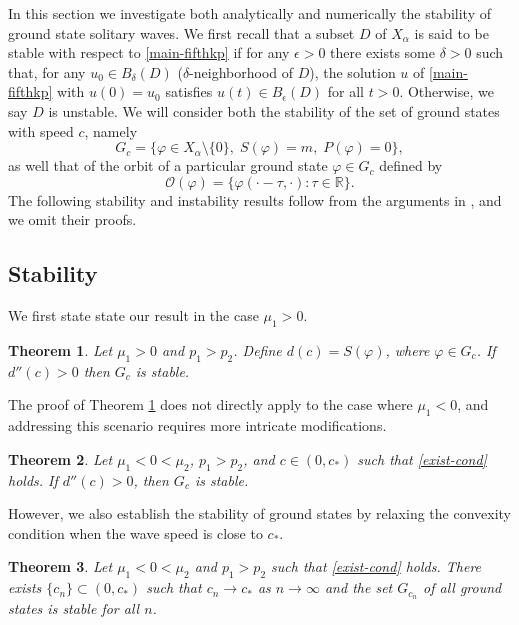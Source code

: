 \documentclass[10pt]{article}
\numberwithin{equation}{section}
\newtheorem{theorem}{\quad Theorem}[section]
\newcommand{\ff}{\varphi}
\newcommand{\mo}{\mu_1}  \newcommand{\po}{{p_1}}
\newcommand{\moo}{\mu_2}  \newcommand{\poo}{{p_2}}
\newcommand{\al}{\alpha}
\begin{document}
	In this section we investigate both analytically and numerically the stability of ground state solitary waves. We first recall that a subset $D$ of $X_\al$ is said to be stable with respect to \eqref{main-fifthkp} if for any
	$\epsilon>0$ there exists some $\delta > 0$ such that, for any $u_0\in B_\delta (D)$ ($\delta$-neighborhood of $D$), the solution $u$ of \eqref{main-fifthkp} with $u(0) = u_0$ satisfies
	$u(t)\in B_\epsilon(D) $ for all $t > 0$. Otherwise, we say $D$ is unstable. We will consider both the stability of the set of ground states with speed $c$, namely
	\[
	G_c=\{\ff\in X_\al\setminus\{0\},\;S(\ff)=m,\;P(\ff)=0\},
	\]
	as well that of the orbit of a particular ground state $\ff\in G_c$ defined by
	\[
	\mathcal{O}(\ff)=\{\ff(\cdot-\tau,\cdot):\tau\in\mathbb R\}.
	\]
	The following stability and instability results follow from the arguments in \cite{esfahani-levan-dpde}, and we omit their proofs.
	\subsection{Stability}
	 We first state state our result in the case $\mo>0$.
	\begin{theorem}\label{stability}
	Let $\mo>0$ and $\po>\poo$.
		 Define $d(c)=S(\ff)$, where $\ff\in G_c$. If $d''(c)>0$ then $G_c$ is stable.
	\end{theorem}
 The proof of Theorem \ref{stability} does not directly apply to the case where $\mu_1 < 0$, and addressing this scenario requires more intricate modifications.
 	\begin{theorem}\label{T:stability}
 	Let	$\mo<0<\moo$, $\po>\poo$, and $c\in(0,c_\ast)$ such that \eqref{exist-cond} holds. If $d''(c)>0$, then $G_c$ is stable.
 \end{theorem}
 
However, we also establish the stability of ground states by relaxing the convexity condition when the wave speed is close to $c_\ast$.
 
		\begin{theorem}\label{stab-theopq}
Let	$\mo<0<\moo$ and $\po>\poo$ such that \eqref{exist-cond} holds.	There exists $\{c_n\}\subset(0,c_\ast)$ such that $c_n\to c_\ast$ as $n\to\infty$ and the set $G_{c_n}$ of all ground states is stable for all $n$.
	\end{theorem}
	
\end{document}
